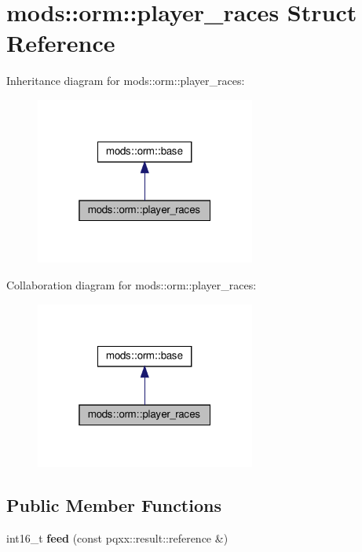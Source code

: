 \hypertarget{structmods_1_1orm_1_1player__races}{}\section{mods\+:\+:orm\+:\+:player\+\_\+races Struct Reference}
\label{structmods_1_1orm_1_1player__races}


Inheritance diagram for mods\+:\+:orm\+:\+:player\+\_\+races\+:\nopagebreak
\begin{figure}[H]
\begin{center}
\leavevmode
\includegraphics[width=205pt]{structmods_1_1orm_1_1player__races__inherit__graph}
\end{center}
\end{figure}


Collaboration diagram for mods\+:\+:orm\+:\+:player\+\_\+races\+:\nopagebreak
\begin{figure}[H]
\begin{center}
\leavevmode
\includegraphics[width=205pt]{structmods_1_1orm_1_1player__races__coll__graph}
\end{center}
\end{figure}
\subsection*{Public Member Functions}
\begin{DoxyCompactItemize}
\item 
\mbox{\label{structmods_1_1orm_1_1player__races_a8c765b0c5aa5d5bdf2247dcca209445f}} 
int16\+\_\+t {\bfseries feed} (const pqxx\+::result\+::reference \&)
\end{DoxyCompactItemize}
